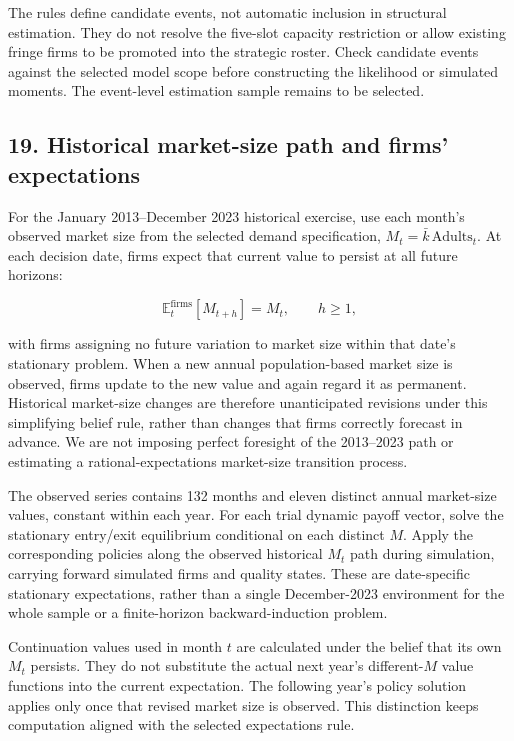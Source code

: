 \documentclass[10pt,]{article}
\begin{document}
The rules define candidate events, not automatic inclusion in structural
estimation. They do not resolve the five-slot capacity restriction or
allow existing fringe firms to be promoted into the strategic roster.
Check candidate events against the selected model scope before
constructing the likelihood or simulated moments. The event-level
estimation sample remains to be selected.

\subsection{19. Historical market-size path and firms'
expectations}\label{historical-market-size-path-and-firms-expectations}

For the January 2013--December 2023 historical exercise, use each
month's observed market size from the selected demand specification,
\(M_t=\bar{k}\,\mathrm{Adults}_t\). At each decision date, firms expect
that current value to persist at all future horizons:

\[
\mathbb{E}^{\mathrm{firms}}_t[M_{t+h}]=M_t,\qquad h\geq1,
\]

with firms assigning no future variation to market size within that
date's stationary problem. When a new annual population-based market
size is observed, firms update to the new value and again regard it as
permanent. Historical market-size changes are therefore unanticipated
revisions under this simplifying belief rule, rather than changes that
firms correctly forecast in advance. We are not imposing perfect
foresight of the 2013--2023 path or estimating a rational-expectations
market-size transition process.

The observed series contains 132 months and eleven distinct annual
market-size values, constant within each year. For each trial dynamic
payoff vector, solve the stationary entry/exit equilibrium conditional
on each distinct \(M\). Apply the corresponding policies along the
observed historical \(M_t\) path during simulation, carrying forward
simulated firms and quality states. These are date-specific stationary
expectations, rather than a single December-2023 environment for the
whole sample or a finite-horizon backward-induction problem.

Continuation values used in month \(t\) are calculated under the belief
that its own \(M_t\) persists. They do not substitute the actual next
year's different-\(M\) value functions into the current expectation. The
following year's policy solution applies only once that revised market
size is observed. This distinction keeps computation aligned with the
selected expectations rule.
\end{document}
